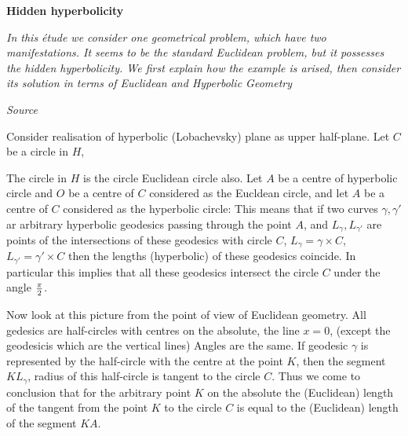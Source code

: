 



\baselineskip=14pt
\def\vare {\varepsilon}
\def\A {{\bf A}}
\def\t {\tilde}
\def\a {\alpha}
\def\K {{\bf K}}
\def\N {{\bf N}}
\def\V {{\cal V}}
\def\s {{\sigma}}
\def\S {{\Sigma}}
\def\s {{\sigma}}
\def\p{\partial}
\def\vare{{\varepsilon}}
\def\Q {{\bf Q}}
\def\D {{\cal D}}
\def\G {{\Gamma}}
\def\C {{\bf C}}
\def\M {{\cal M}}
\def\Z {{\bf Z}}
\def\U  {{\cal U}}
\def\H {{\cal H}}
\def\R  {{\bf R}}
\def\S  {{\bf S}}
\def\E  {{\bf E}}
\def\l {\lambda}
\def\degree {{\bf {\rm degree}\,\,}}
\def \finish {${\,\,\vrule height1mm depth2mm width 8pt}$}
\def \m {\medskip}
\def\p {\partial}
\def\r {{\bf r}}
\def\pt {{\bf pt}}
\def\v {{\bf v}}
\def\n {{\bf n}}
\def\t {{\bf t}}
\def\b {{\bf b}}
\def\c {{\bf c }}
\def\e{{\bf e}}
\def\ac {{\bf a}}
\def \X   {{\bf X}}
\def \Y   {{\bf Y}}
\def \x   {{\bf x}}
\def \y   {{\bf y}}
\def \G{{\cal G}}



\centerline {\bf Hidden hyperbolicity}

{\it In this \'etude we consider one geometrical problem,
which have two manifestations. It seems to be
the standard Euclidean problem,  but it
 possesses the hidden hyperbolicity.
We first explain how the example is arised, then consider
its solution in terms of Euclidean and Hyperbolic Geometry}

\m

\centerline {\it Source}

Consider realisation of hyperbolic (Lobachevsky) plane
as upper half-plane. Let $C$ be a circle in $H$,

  The circle in $H$ is the circle Euclidean
circle also. Let $A$ be a centre of hyperbolic circle 
and $O$ be a centre of $C$ considered 
as the Eucldean circle, and 
let $A$ be a centre of $C$ considered 
as the hyperbolic  circle:
This means that if two curves $\gamma,\gamma'$ ar  
arbitrary hyperbolic geodesics
passing through the point $A$, and 
$L_\gamma,L_{\gamma'} $ are points
of the intersections of these geodesics 
with circle $C$, 
$L_\gamma=\gamma\times C$,  
$L_{\gamma'}=\gamma'\times C$  
then the lengths (hyperbolic) of these geodesics 
coincide. In particular this implies
that all these geodesics intersect the circle $C$
under the angle $\pi\over 2$.

Now look at this picture from the point of view 
of Euclidean geometry. 
   All gedesics are half-circles
with centres on the absolute, the line $x=0$,
(except the geodesicis which are the vertical lines)
Angles are the same. If geodesic $\gamma$ is represented
by the half-circle with the centre at the point 
$K$, then the segment $KL_\gamma$, radius of this half-circle
is tangent to the circle $C$.
 Thus we come to conclusion
that for the arbitrary  point $K$ on the absolute
the (Euclidean) length of the tangent from the point $K$ to the
circle $C$ is equal to the (Euclidean) length of the segment $KA$.

